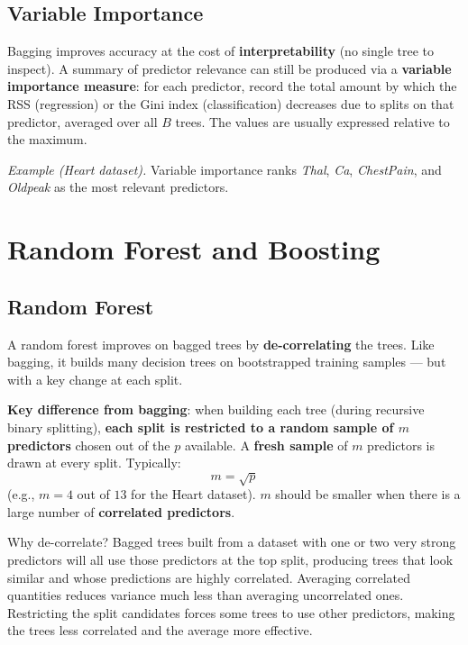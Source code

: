 \documentclass[11pt,a4paper]{article}
\theoremstyle{definition}
\theoremstyle{plain}
\theoremstyle{remark}
\begin{document}
\subsection{Variable Importance}

Bagging improves accuracy at the cost of \textbf{interpretability} (no single tree to inspect). A summary of predictor relevance can still be produced via a \textbf{variable importance measure}: for each predictor, record the total amount by which the RSS (regression) or the Gini index (classification) decreases due to splits on that predictor, averaged over all $B$ trees. The values are usually expressed relative to the maximum.

\textit{Example (Heart dataset).} Variable importance ranks \textit{Thal}, \textit{Ca}, \textit{ChestPain}, and \textit{Oldpeak} as the most relevant predictors.


\section{Random Forest and Boosting}

\subsection{Random Forest}

\begin{tcolorbox}[colback=blue!5!white,colframe=blue!75!black,title=\textbf{Random Forest}]
A random forest improves on bagged trees by \textbf{de-correlating} the trees. Like bagging, it builds many decision trees on bootstrapped training samples — but with a key change at each split.
\end{tcolorbox}

\textbf{Key difference from bagging}: when building each tree (during recursive binary splitting), \textbf{each split is restricted to a random sample of $m$ predictors} chosen out of the $p$ available. A \textbf{fresh sample} of $m$ predictors is drawn at every split. Typically:
\[
    m = \sqrt{p}
\]
(e.g., $m = 4$ out of $13$ for the Heart dataset). $m$ should be smaller when there is a large number of \textbf{correlated predictors}.

Why de-correlate? Bagged trees built from a dataset with one or two very strong predictors will all use those predictors at the top split, producing trees that look similar and whose predictions are highly correlated. Averaging correlated quantities reduces variance much less than averaging uncorrelated ones. Restricting the split candidates forces some trees to use other predictors, making the trees less correlated and the average more effective.
\end{document}
